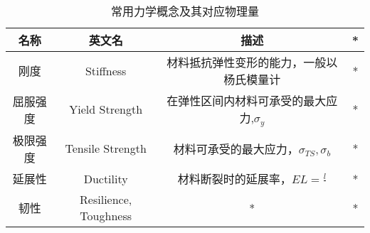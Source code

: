 
\begin{table}[ht]
\centering
\caption{常用力学概念及其对应物理量}\label{SSCUR_tab1}
\begin{tabular}{|c|c|c|c|}
\hline
名称 & 英文名 & 描述 & * \\
\hline
刚度 & Stiffness & 材料抵抗弹性变形的能力，一般以杨氏模量计 & * \\
\hline
屈服强度 & Yield Strength & 在弹性区间内材料可承受的最大应力,$\sigma_y$ & * \\
\hline
极限强度 & Tensile Strength & 材料可承受的最大应力，$\sigma_{TS}, \sigma_b$ & * \\
\hline
延展性 & Ductility & 材料断裂时的延展率，$EL = \frac{l}{} $ & * \\
\hline
韧性 & Resilience, Toughness & * & * \\
\hline
\end{tabular}
\end{table}
